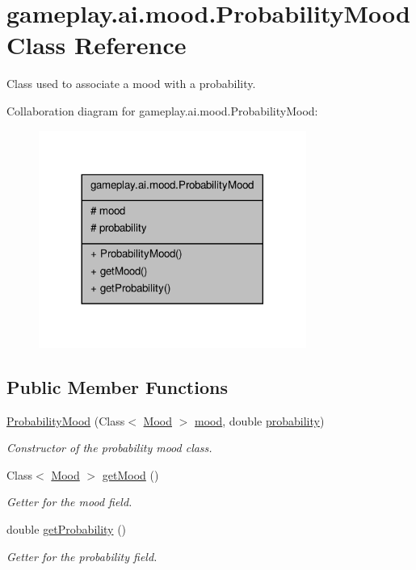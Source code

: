 \hypertarget{a00021}{\section{gameplay.\-ai.\-mood.\-Probability\-Mood Class Reference}
\label{a00021}
}


Class used to associate a mood with a probability.  




Collaboration diagram for gameplay.\-ai.\-mood.\-Probability\-Mood\-:
\nopagebreak
\begin{figure}[H]
\begin{center}
\leavevmode
\includegraphics[width=248pt]{a00113}
\end{center}
\end{figure}
\subsection*{Public Member Functions}
\begin{DoxyCompactItemize}
\item 
\hyperlink{a00021_a0cd3142b0fb1df769e3475058e0b968d}{Probability\-Mood} (Class$<$ \hyperlink{a00015}{Mood} $>$ \hyperlink{a00021_afe864a647d2e9d766688d5e7549feec4}{mood}, double \hyperlink{a00021_a44377e9c9418a71f5151439c58f7b555}{probability})
\begin{DoxyCompactList}\small\item\em Constructor of the probability mood class. \end{DoxyCompactList}\item 
Class$<$ \hyperlink{a00015}{Mood} $>$ \hyperlink{a00021_ae36103079d0cd5fee9a69bf427a8e3b0}{get\-Mood} ()
\begin{DoxyCompactList}\small\item\em Getter for the mood field. \end{DoxyCompactList}\item 
double \hyperlink{a00021_a5744b122182f8a9a79d759764ed2d3e1}{get\-Probability} ()
\begin{DoxyCompactList}\small\item\em Getter for the probability field. \end{DoxyCompactList}\end{DoxyCompactItemize}
